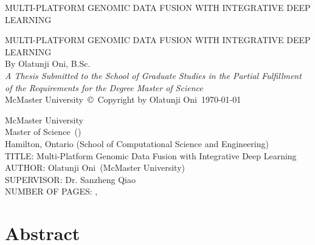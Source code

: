 \documentclass[12pt, twoside]{report}
\begin{document}
\thispagestyle{empty}
\vspace*{\fill}
\begin{center}
\textsc{\Large MULTI-PLATFORM GENOMIC DATA FUSION WITH INTEGRATIVE DEEP LEARNING}
\end{center}
\vspace*{\fill}

\setcounter{page}{0}
\clearpage

\thispagestyle{empty}
\begin{center}
    \vfill
    \textsc{\Large MULTI-PLATFORM GENOMIC DATA FUSION WITH INTEGRATIVE DEEP LEARNING}\\
    \vfill
    By Olatunji Oni, B.Sc. \\
    \vfill
    {\large \textit{A Thesis Submitted to the School of Graduate Studies in the Partial Fulfillment of the Requirements for the Degree Master of Science}}\\

    \vfill
    {\large McMaster University\, \copyright\, Copyright by Olatunji Oni\, \today}\\[4cm]
\end{center}

\newpage
{}
\setcounter{page}{2}

\begin{singlespace}
    \noindent
    McMaster University \\ 
    Master of Science\, (\the\year) \\
    Hamilton, Ontario (School of Computational Science and Engineering) \\[1.5cm]
    TITLE: Multi-Platform Genomic Data Fusion with Integrative Deep Learning \\
    AUTHOR: Olatunji Oni\,  %
    (McMaster University)  \\
    SUPERVISOR: Dr. Sanzheng Qiao\, \\ 
    NUMBER OF PAGES: \pageref{lastoffront}, \pageref{LastPage}
\end{singlespace}

\clearpage
\section*{\Huge Abstract} 
\clearpage

\end{document}
